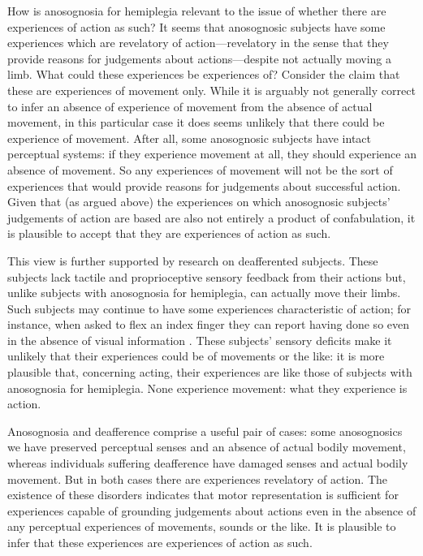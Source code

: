 \documentclass[12pt,\papersize]{extarticle}
\begin{document}
How is anosognosia for hemiplegia relevant to the issue of whether there are experiences of action as such?  It seems that anosognosic subjects have some experiences which are revelatory of action---revelatory in the sense that they provide reasons for judgements about actions---despite not actually moving a limb.  What could these experiences be experiences of?  Consider the claim that these are experiences of movement only.  While it is arguably not generally correct to infer an absence of experience of movement from the absence of actual movement, in this particular case it does seems unlikely that there could be experience of movement.  After all, some anosognosic subjects have intact perceptual systems: if they experience movement at all, they should experience an absence of movement.  So any experiences of movement will not be the sort of experiences that would provide reasons for judgements about successful action.  Given that (as argued above) the experiences on which anosognosic subjects' judgements of action are based are also not entirely a product of confabulation, it is plausible to accept that they are experiences of action as such.

This view is further supported by research on deafferented subjects.  These subjects lack tactile and proprioceptive sensory feedback from their actions but, unlike subjects with anosognosia for hemiplegia, can actually move their limbs.  Such subjects may continue to have some experiences characteristic of action; for instance, when asked to flex an index finger they can report having done so even in the absence of visual information \citep{kristeva:2006}.  These subjects' sensory deficits make it unlikely that their experiences could be of movements or the like: it is more plausible that, concerning acting, their experiences are like those of subjects with anosognosia for hemiplegia.  None experience movement: what they experience is action.

Anosognosia and deafference comprise a useful pair of cases: some anosognosics we have preserved perceptual senses and an absence of actual bodily movement, whereas individuals suffering deafference have damaged senses and actual bodily movement.  But in both cases there are experiences revelatory of action.  The existence of these disorders indicates that motor representation is sufficient for experiences capable of grounding judgements about actions even in the absence of any perceptual experiences of movements, sounds or the like.  It is plausible to infer that these experiences are experiences of action as such.
\end{document}
